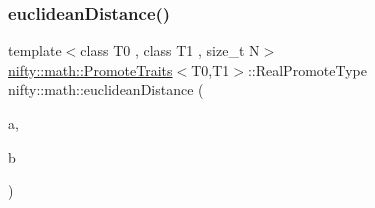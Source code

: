\subsubsection{\texorpdfstring{euclidean\+Distance()}{euclideanDistance()}}
{\footnotesize\ttfamily template$<$class T0 , class T1 , size\+\_\+t N$>$ \\
\hyperlink{structnifty_1_1math_1_1PromoteTraits}{nifty\+::math\+::\+Promote\+Traits}$<$T0,T1$>$\+::Real\+Promote\+Type nifty\+::math\+::euclidean\+Distance (\begin{DoxyParamCaption}\item[{const \hyperlink{namespacenifty_1_1array_a683f151f19c851754e0c6d55ed16a0c2}{nifty\+::array\+::\+Static\+Array}$<$ T0, N $>$ \&}]{a,  }\item[{const \hyperlink{namespacenifty_1_1array_a683f151f19c851754e0c6d55ed16a0c2}{nifty\+::array\+::\+Static\+Array}$<$ T1, N $>$ \&}]{b }\end{DoxyParamCaption})}


